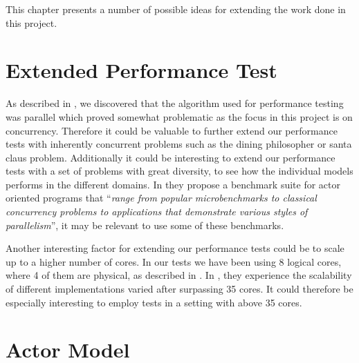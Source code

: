\makeatletter {}\makeatother
{}
This chapter presents a number of possible ideas for extending the work done in this project.

\section{Extended Performance Test}
As described in , we discovered that the algorithm used for performance testing was parallel which proved somewhat problematic as the focus in this project is on concurrency. Therefore it could be valuable to further extend our performance tests with inherently concurrent problems such as the dining philosopher or santa claus problem. Additionally it could be interesting to extend our performance tests with a set of problems with great diversity, to see how the individual models performs in the different domains. In \cite{imam2014savina} they propose a benchmark suite for actor oriented programs that ``\textit{range from popular microbenchmarks to classical concurrency problems to applications that demonstrate various styles of parallelism}'', it may be relevant to use some of these benchmarks.

Another interesting factor for extending our performance tests could be to scale up to a higher number of cores. In our tests we have been using 8 logical cores, where 4 of them are physical, as described in . In \cite{harris2003language}, they experience the scalability of different implementations varied after surpassing 35 cores. It could therefore be especially interesting to employ tests in a setting with above 35 cores.



\section{Actor Model}

	

\worksheetend
